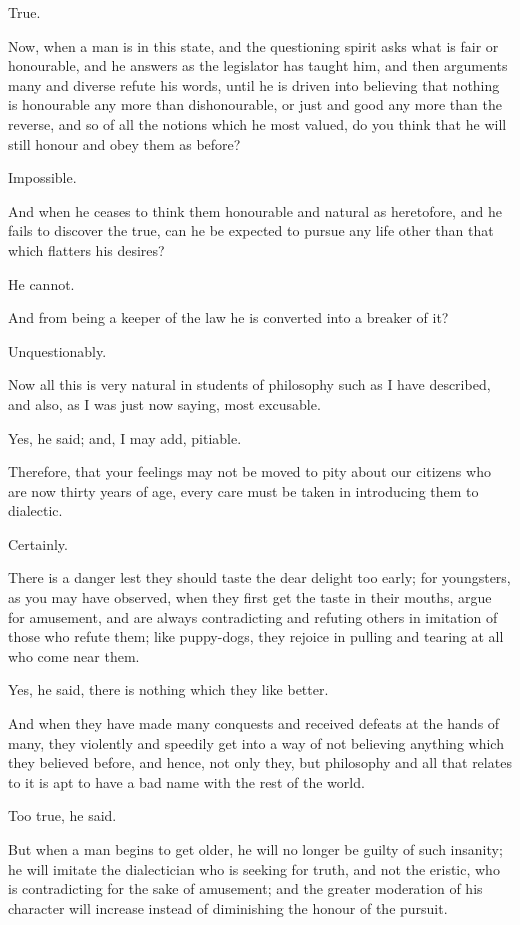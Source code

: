 True.

Now, when a man is in this state, and the questioning spirit asks what
is fair or honourable, and he answers as the legislator has taught him,
and then arguments many and diverse refute his words, until he is driven
into believing that nothing is honourable any more than dishonourable,
or just and good any more than the reverse, and so of all the notions
which he most valued, do you think that he will still honour and obey
them as before?

Impossible.

And when he ceases to think them honourable and natural as heretofore,
and he fails to discover the true, can he be expected to pursue any life
other than that which flatters his desires?

He cannot.

And from being a keeper of the law he is converted into a breaker of it?

Unquestionably.

Now all this is very natural in students of philosophy such as I have
described, and also, as I was just now saying, most excusable.

Yes, he said; and, I may add, pitiable.

Therefore, that your feelings may not be moved to pity about our
citizens who are now thirty years of age, every care must be taken in
introducing them to dialectic.

Certainly.

There is a danger lest they should taste the dear delight too early; for
youngsters, as you may have observed, when they first get the taste
in their mouths, argue for amusement, and are always contradicting and
refuting others in imitation of those who refute them; like puppy-dogs,
they rejoice in pulling and tearing at all who come near them.

Yes, he said, there is nothing which they like better.

And when they have made many conquests and received defeats at the hands
of many, they violently and speedily get into a way of not believing
anything which they believed before, and hence, not only they, but
philosophy and all that relates to it is apt to have a bad name with the
rest of the world.

Too true, he said.

But when a man begins to get older, he will no longer be guilty of such
insanity; he will imitate the dialectician who is seeking for truth, and
not the eristic, who is contradicting for the sake of amusement; and the
greater moderation of his character will increase instead of diminishing
the honour of the pursuit.

